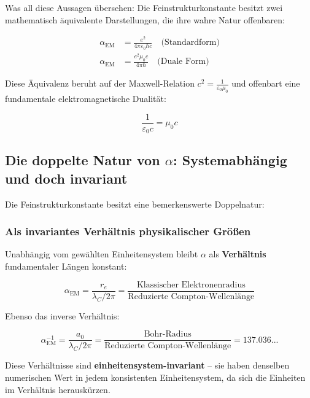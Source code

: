 Was all diese Aussagen übersehen: Die Feinstrukturkonstante besitzt zwei mathematisch äquivalente Darstellungen, die ihre wahre Natur offenbaren:

\begin{align}
	\alpha_{\text{EM}} &= \frac{e^2}{4\pi\varepsilon_0\hbar c} \quad \text{(Standardform)} \label{eq:alpha_standard}\\
	\alpha_{\text{EM}} &= \frac{e^2 \mu_0 c}{4\pi \hbar} \quad \text{(Duale Form)} \label{eq:alpha_dual}
\end{align}

Diese Äquivalenz beruht auf der Maxwell-Relation $c^2 = \frac{1}{\varepsilon_0\mu_0}$ und offenbart eine fundamentale elektromagnetische Dualität:

\begin{equation}
	\frac{1}{\varepsilon_0 c} = \mu_0 c
	\label{eq:em_duality}
\end{equation}

\subsection{Die doppelte Natur von $\alpha$: Systemabhängig und doch invariant}
\label{subsec:double_nature}

Die Feinstrukturkonstante besitzt eine bemerkenswerte Doppelnatur:

\subsubsection{Als invariantes Verhältnis physikalischer Größen}
\label{subsubsec:invariant_ratio}

Unabhängig vom gewählten Einheitensystem bleibt $\alpha$ als \textbf{Verhältnis} fundamentaler Längen konstant:

\begin{equation}
	\alpha_{\text{EM}} = \frac{r_e}{\lambda_C/2\pi} = \frac{\text{Klassischer Elektronenradius}}{\text{Reduzierte Compton-Wellenlänge}}
	\label{eq:alpha_ratio_re}
\end{equation}

Ebenso das inverse Verhältnis:

\begin{equation}
	\alpha_{\text{EM}}^{-1} = \frac{a_0}{\lambda_C/2\pi} = \frac{\text{Bohr-Radius}}{\text{Reduzierte Compton-Wellenlänge}} = 137.036...
	\label{eq:alpha_ratio_bohr}
\end{equation}

Diese Verhältnisse sind \textbf{einheitensystem-invariant} -- sie haben denselben numerischen Wert in jedem konsistenten Einheitensystem, da sich die Einheiten im Verhältnis herauskürzen.

